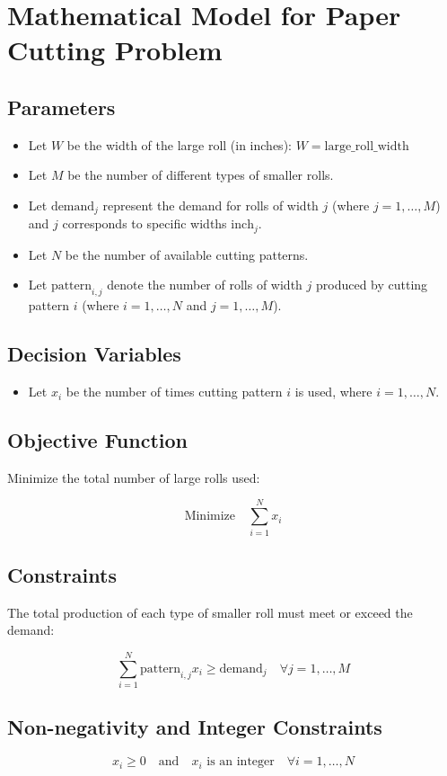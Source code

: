 \documentclass{article}
\begin{document}
\section*{Mathematical Model for Paper Cutting Problem}

\subsection*{Parameters}

\begin{itemize}
    \item Let \( W \) be the width of the large roll (in inches): \( W = \text{large\_roll\_width} \)
    \item Let \( M \) be the number of different types of smaller rolls.
    \item Let \( \text{demand}_j \) represent the demand for rolls of width \( j \) (where \( j = 1, \ldots, M \)) and \( j \) corresponds to specific widths \( \text{inch}_j \).
    \item Let \( N \) be the number of available cutting patterns.
    \item Let \( \text{pattern}_{i,j} \) denote the number of rolls of width \( j \) produced by cutting pattern \( i \) (where \( i = 1, \ldots, N \) and \( j = 1, \ldots, M \)).
\end{itemize}

\subsection*{Decision Variables}

\begin{itemize}
    \item Let \( x_i \) be the number of times cutting pattern \( i \) is used, where \( i = 1, \ldots, N \).
\end{itemize}

\subsection*{Objective Function}

Minimize the total number of large rolls used:

\[
\text{Minimize} \quad \sum_{i=1}^{N} x_i
\]

\subsection*{Constraints}

The total production of each type of smaller roll must meet or exceed the demand:

\[
\sum_{i=1}^{N} \text{pattern}_{i,j} x_i \geq \text{demand}_j \quad \forall j = 1, \ldots, M
\]

\subsection*{Non-negativity and Integer Constraints}

\[
x_i \geq 0 \quad \text{and} \quad x_i \text{ is an integer} \quad \forall i = 1, \ldots, N
\]
\end{document}
